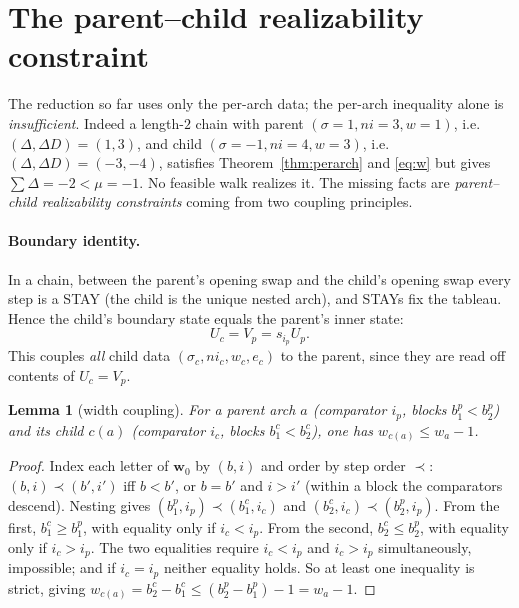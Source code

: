 \documentclass[11pt]{article}
\theoremstyle{plain}
\newtheorem{lemma}[theorem]{Lemma}
\theoremstyle{remark}
\begin{document}
\section{The parent--child realizability constraint}
The reduction so far uses only the per-arch data; the per-arch inequality alone is
\emph{insufficient}. Indeed a length-$2$ chain with parent $(\sigma{=}1,ni{=}3,w{=}1)$, i.e.
$(\Delta,\Delta D)=(1,3)$, and child $(\sigma{=}-1,ni{=}4,w{=}3)$, i.e.
$(\Delta,\Delta D)=(-3,-4)$, satisfies Theorem~\ref{thm:perarch} and \eqref{eq:w} but gives
$\sum\Delta=-2<\mu=-1$. No feasible walk realizes it. The missing facts are
\emph{parent--child realizability constraints} coming from two coupling principles.

\paragraph{Boundary identity.} In a chain, between the parent's opening swap and the child's
opening swap every step is a STAY (the child is the unique nested arch), and STAYs fix the
tableau. Hence the child's boundary state equals the parent's inner state:
\begin{equation}\label{eq:bdy}
U_{c}=V_{p}=s_{i_p}U_{p}.
\end{equation}
This couples \emph{all} child data $(\sigma_c,ni_c,w_c,e_c)$ to the parent, since they are read
off contents of $U_c=V_p$.

\begin{lemma}[width coupling]\label{lem:width}
For a parent arch $a$ (comparator $i_p$, blocks $b_1^p<b_2^p$) and its child $c(a)$ (comparator
$i_c$, blocks $b_1^c<b_2^c$), one has $w_{c(a)}\le w_a-1$.
\end{lemma}
\begin{proof}
Index each letter of $\mathbf w_0$ by $(b,i)$ and order by step order $\prec$: $(b,i)\prec(b',i')$
iff $b<b'$, or $b=b'$ and $i>i'$ (within a block the comparators descend). Nesting gives
$(b_1^p,i_p)\prec(b_1^c,i_c)$ and $(b_2^c,i_c)\prec(b_2^p,i_p)$. From the first, $b_1^c\ge b_1^p$,
with equality only if $i_c<i_p$. From the second, $b_2^c\le b_2^p$, with equality only if
$i_c>i_p$. The two equalities require $i_c<i_p$ and $i_c>i_p$ simultaneously, impossible; and if
$i_c=i_p$ neither equality holds. So at least one inequality is strict, giving
$w_{c(a)}=b_2^c-b_1^c\le(b_2^p-b_1^p)-1=w_a-1$.
\end{proof}
\end{document}
